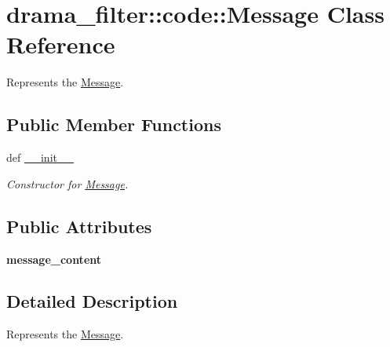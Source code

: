 \hypertarget{classdrama__filter_1_1code_1_1Message}{
\section{drama\_\-filter::code::Message Class Reference}
\label{classdrama__filter_1_1code_1_1Message}
}


Represents the \hyperlink{classdrama__filter_1_1code_1_1Message}{Message}.  


\subsection*{Public Member Functions}
\begin{DoxyCompactItemize}
\item 
def \hyperlink{classdrama__filter_1_1code_1_1Message_a2e6930075e16c0824c06fe94d85c489d}{\_\-\_\-init\_\-\_\-}
\begin{DoxyCompactList}\small\item\em Constructor for \hyperlink{classdrama__filter_1_1code_1_1Message}{Message}. \end{DoxyCompactList}\end{DoxyCompactItemize}
\subsection*{Public Attributes}
\begin{DoxyCompactItemize}
\item 
\hypertarget{classdrama__filter_1_1code_1_1Message_a07ee895c1bd226d2a7994ddd4361c963}{
{\bfseries message\_\-content}}
\label{classdrama__filter_1_1code_1_1Message_a07ee895c1bd226d2a7994ddd4361c963}

\end{DoxyCompactItemize}


\subsection{Detailed Description}
Represents the \hyperlink{classdrama__filter_1_1code_1_1Message}{Message}. 


